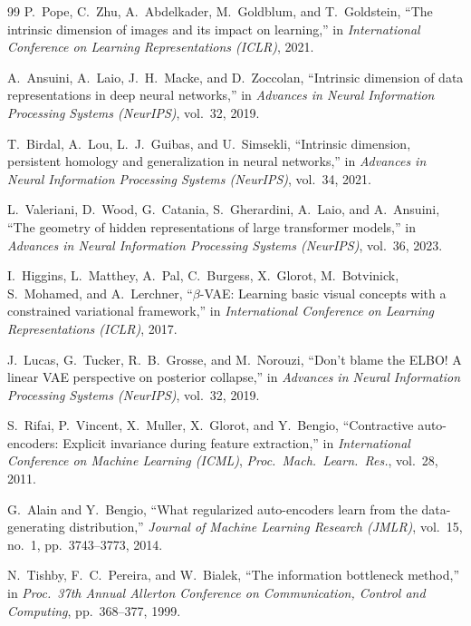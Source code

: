 \documentclass[11pt,a4paper]{jsarticle}
\begin{document}
\begin{thebibliography}{99}
P.~Pope, C.~Zhu, A.~Abdelkader, M.~Goldblum, and T.~Goldstein,
``The intrinsic dimension of images and its impact on learning,''
in \textit{International Conference on Learning Representations (ICLR)}, 2021.

A.~Ansuini, A.~Laio, J.~H.~Macke, and D.~Zoccolan,
``Intrinsic dimension of data representations in deep neural networks,''
in \textit{Advances in Neural Information Processing Systems (NeurIPS)},
vol.~32, 2019.

T.~Birdal, A.~Lou, L.~J.~Guibas, and U.~Simsekli,
``Intrinsic dimension, persistent homology and generalization
in neural networks,''
in \textit{Advances in Neural Information Processing Systems (NeurIPS)},
vol.~34, 2021.

L.~Valeriani, D.~Wood, G.~Catania, S.~Gherardini, A.~Laio, and A.~Ansuini,
``The geometry of hidden representations of large transformer models,''
in \textit{Advances in Neural Information Processing Systems (NeurIPS)},
vol.~36, 2023.

I.~Higgins, L.~Matthey, A.~Pal, C.~Burgess, X.~Glorot, M.~Botvinick,
S.~Mohamed, and A.~Lerchner,
``$\beta$-VAE: Learning basic visual concepts with a constrained variational framework,''
in \textit{International Conference on Learning Representations (ICLR)}, 2017.

J.~Lucas, G.~Tucker, R.~B.~Grosse, and M.~Norouzi,
``Don't blame the ELBO! A linear VAE perspective on posterior collapse,''
in \textit{Advances in Neural Information Processing Systems (NeurIPS)}, vol.~32, 2019.

S.~Rifai, P.~Vincent, X.~Muller, X.~Glorot, and Y.~Bengio,
``Contractive auto-encoders: Explicit invariance during feature extraction,''
in \textit{International Conference on Machine Learning (ICML)},
\textit{Proc.~Mach.~Learn.~Res.}, vol.~28, 2011.

G.~Alain and Y.~Bengio,
``What regularized auto-encoders learn from the data-generating distribution,''
\textit{Journal of Machine Learning Research (JMLR)}, vol.~15, no.~1,
pp.~3743--3773, 2014.

N.~Tishby, F.~C.~Pereira, and W.~Bialek,
``The information bottleneck method,''
in \textit{Proc.~37th Annual Allerton Conference on Communication, Control and Computing},
pp.~368--377, 1999.


\end{thebibliography}
\end{document}
